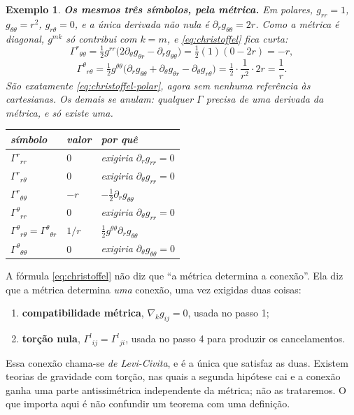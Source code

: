 \documentclass[12pt,a4paper,oneside]{book}
\theoremstyle{rgplain}
\newtheorem{example}{Exemplo}[chapter]
\theoremstyle{rgremark}
\begin{document}
\begin{example}
\textbf{Os mesmos três símbolos, pela métrica.} Em polares, $g_{rr}=1$,
$g_{\theta\theta}=r^2$, $g_{r\theta}=0$, e a \emph{única} derivada não nula é
$\partial_rg_{\theta\theta}=2r$. Como a métrica é diagonal, $g^{mk}$ só
contribui com $k=m$, e \eqref{eq:christoffel} fica curta:
\[
  \Gamma^r{}_{\theta\theta}
  =\tfrac12 g^{rr}\bigl(2\partial_\theta g_{\theta r}
  -\partial_rg_{\theta\theta}\bigr)
  =\tfrac12(1)(0-2r)=-r ,
\]
\[
  \Gamma^\theta{}_{r\theta}
  =\tfrac12 g^{\theta\theta}\bigl(\partial_rg_{\theta\theta}
  +\partial_\theta g_{\theta r}-\partial_\theta g_{r\theta}\bigr)
  =\tfrac12\cdot\frac{1}{r^2}\cdot 2r=\frac1r .
\]
São exatamente \eqref{eq:christoffel-polar}, agora sem nenhuma referência às
cartesianas. Os demais se anulam: qualquer $\Gamma$ precisa de uma derivada da
métrica, e só existe uma.

\begin{center}
\small
\begin{tabular}{lll}
\toprule
símbolo & valor & por quê \\
\midrule
$\Gamma^r{}_{rr}$ & $0$ & exigiria $\partial_rg_{rr}=0$ \\
$\Gamma^r{}_{r\theta}$ & $0$ & exigiria $\partial_\theta g_{rr}=0$ \\
$\Gamma^r{}_{\theta\theta}$ & $-r$ & $-\tfrac12\partial_rg_{\theta\theta}$ \\
$\Gamma^\theta{}_{rr}$ & $0$ & exigiria $\partial_\theta g_{rr}=0$ \\
$\Gamma^\theta{}_{r\theta}=\Gamma^\theta{}_{\theta r}$ & $1/r$ &
  $\tfrac12 g^{\theta\theta}\partial_rg_{\theta\theta}$ \\
$\Gamma^\theta{}_{\theta\theta}$ & $0$ & exigiria
  $\partial_\theta g_{\theta\theta}=0$ \\
\bottomrule
\end{tabular}
\end{center}
\end{example}

\begin{atencao}[title={\sffamily\bfseries\footnotesize\color{rgTerracota}O QUE A MÉTRICA DETERMINA, E SOB QUE HIPÓTESES}]
A fórmula \eqref{eq:christoffel} não diz que ``a métrica determina a
conexão''. Ela diz que a métrica determina \emph{uma} conexão, uma vez
exigidas duas coisas:
\begin{enumerate}
  \item \textbf{compatibilidade métrica}, $\nabla_kg_{ij}=0$, usada no passo 1;
  \item \textbf{torção nula}, $\Gamma^l{}_{ij}=\Gamma^l{}_{ji}$, usada no
  passo 4 para produzir os cancelamentos.
\end{enumerate}
Essa conexão chama-se \emph{de Levi-Civita}, e é a única que satisfaz as duas.
Existem teorias de gravidade com torção, nas quais a segunda hipótese cai e a
conexão ganha uma parte antissimétrica independente da métrica; não as
trataremos. O que importa aqui é não confundir um teorema com uma definição.
\end{atencao}
\end{document}
